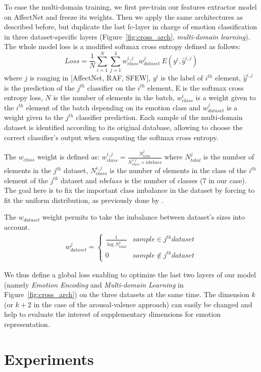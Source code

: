 \documentclass{bmvc2k}
\begin{document}
To ease the multi-domain training, we first pre-train our features extractor model on AffectNet and freeze its weights. Then we apply the same architectures as described before, but duplicate the last fc-layer in charge of emotion classification in three dataset-specific layers (Figure~\ref{fig:cross_arch}, \textit{multi-domain learning}). The whole model loss is a modified softmax cross entropy defined as follows:
\begin{equation}
Loss=\frac{1}{N} \sum_{i=1}^{N} \sum_{j=1}^{3} w_{class}^{i,j} w_{dataset}^{j} \ E(y^i,\hat{y}^{i,j})
\end{equation}
where $j$ is ranging in [AffectNet, RAF, SFEW],  $y^i$ is the label of $i^{th}$ element, $\hat{y}^{i,j}$ is the prediction of the $j^{th}$ classifier on the $i^{th}$ element, E is the softmax cross entropy loss,  $N$ is the number of elements in the batch, $w_{class}^i$ is a weight given to the $i^{th}$ element of the batch depending on its emotion class and $w_{dataset}^{j}$ is a weight given to the $j^{th}$ classifier prediction.
Each sample of the multi-domain dataset is identified according to its original database, allowing to choose the correct classifier's output when computing the softmax cross entropy.

The $ w_{class}$ weight is defined as:
$
    w_{class}^{i,j} = \frac{N_{total}^j}{N_{class}^{i,j} \times nbclass}
$
where $N_{total}^j$ is the number of elements in the $j^{th}$ dataset, $N_{class}^{i,j}$ is the number of elements in the class of the $i^{th}$ element of the $j^{th}$ dataset and $nbclass$ is the number of classes (7 in our case). The goal here is to fix the important class imbalance in the dataset by forcing to fit the uniform distribution, as previously done by \cite{mollahosseini_affectnet:_2017}.

The $w_{dataset}$ weight permits to take the imbalance between dataset's sizes into account.
\begin{align}
 w_{dataset}^{j}= \left\{
 \begin{array}{cl}
      \frac{1}{\log N_{total}^{j}}  & sample \in j^{th} dataset\\
      0       & sample \notin j^{th} dataset
\end{array}
\right.
\end{align}

We thus define a global loss enabling to optimize the last two layers of our model (namely \textit{Emotion Encoding} and \textit{Multi-domain Learning}  in Figure~\ref{fig:cross_arch}) on the three datasets at the same time. The dimension $k$ (or $k+2$ in the case of the arousal-valence approach) can easily be changed and help to evaluate the interest of supplementary dimensions for emotion representation.  \section{Experiments}
\label{results}
\end{document}
